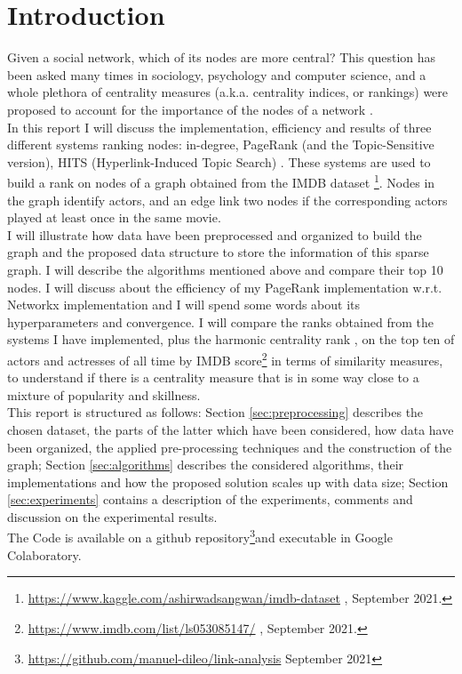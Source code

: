 \documentclass{article}
\begin{document}
\section*{Introduction}
Given a social network, which of its nodes are more central? This question has been asked many times in sociology, psychology and computer science, and a whole plethora of centrality measures (a.k.a. centrality indices, or rankings) were proposed to account for the importance of the nodes of a network \cite{Boldi2013}. \\In this report I will discuss the implementation, efficiency and results of three different systems ranking nodes: in-degree, PageRank \cite{Page1999ThePC} (and the Topic-Sensitive \cite{Tsrank2003} version), HITS (Hyperlink-Induced Topic Search) \cite{Hits1999}. These systems are used to build a rank on nodes of a graph obtained from the IMDB dataset \footnote{\url{https://www.kaggle.com/ashirwadsangwan/imdb-dataset} , September 2021.\label{foo:imdb-dataset}}. Nodes in the graph identify actors, and an edge link two nodes if the corresponding actors played at least once in the same movie.\\ I will illustrate how data have been preprocessed and organized to build the graph and the proposed data structure to store the information of this sparse graph. I will describe the algorithms mentioned above and compare their top 10 nodes. I will discuss about the efficiency of my PageRank implementation w.r.t. Networkx \cite{Networkx2008} implementation and I will spend some words about its hyperparameters and convergence. I will compare the ranks obtained from the systems I have implemented, plus the harmonic centrality rank \cite{Boldi2013}, on the top ten of actors and actresses of all time by IMDB score\footnote{\url{https://www.imdb.com/list/ls053085147/} , September 2021.\label{foo:imdb-top}} in terms of similarity measures, to understand if there is a centrality measure that is in some way close to a mixture of popularity and skillness. \\
This report is structured as follows: Section \ref{sec:preprocessing} describes the chosen dataset, the parts of the latter which have been considered, how data have been organized, the applied pre-processing techniques and the construction of the graph; Section \ref{sec:algorithms} describes the considered algorithms, their implementations and how the proposed solution scales up with data size; Section \ref{sec:experiments} contains a description of the experiments, comments and discussion on the experimental results.\\
The Code is available on a github repository\footnote{\url{https://github.com/manuel-dileo/link-analysis} September 2021}and executable in Google Colaboratory.
\end{document}
